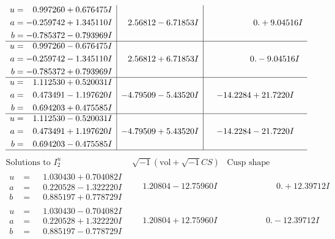 \documentclass[1p]{elsarticle_modified}
\theoremstyle{definition}
\newcommand{\I}{\sqrt{-1}}
\begin{document}
$$\begin{array}{c|c|c}
\begin{aligned}
u &= \phantom{-}0.997260 + 0.676475 I \\
a &= -0.259742 + 1.345110 I \\
b &= -0.785372 - 0.793969 I\end{aligned}
 & \phantom{-}2.56812 - 6.71853 I & \phantom{-0.000000 -}0. + 9.04516 I \\ \hline\begin{aligned}
u &= \phantom{-}0.997260 - 0.676475 I \\
a &= -0.259742 - 1.345110 I \\
b &= -0.785372 + 0.793969 I\end{aligned}
 & \phantom{-}2.56812 + 6.71853 I & \phantom{-0.000000 } 0. - 9.04516 I \\ \hline\begin{aligned}
u &= \phantom{-}1.112530 + 0.520031 I \\
a &= \phantom{-}0.473491 - 1.197620 I \\
b &= \phantom{-}0.694203 + 0.475585 I\end{aligned}
 & -4.79509 - 5.43520 I & -14.2284 + 21.7220 I \\ \hline\begin{aligned}
u &= \phantom{-}1.112530 - 0.520031 I \\
a &= \phantom{-}0.473491 + 1.197620 I \\
b &= \phantom{-}0.694203 - 0.475585 I\end{aligned}
 & -4.79509 + 5.43520 I & -14.2284 - 21.7220 I\\
 \hline 
 \end{array}$$\newpage$$\begin{array}{c|c|c}  
\text{Solutions to }I^u_{2}& \I (\text{vol} + \sqrt{-1}CS) & \text{Cusp shape}\\
 \hline 
\begin{aligned}
u &= \phantom{-}1.030430 + 0.704082 I \\
a &= \phantom{-}0.220528 - 1.322220 I \\
b &= \phantom{-}0.885197 + 0.778729 I\end{aligned}
 & \phantom{-}1.20804 - 12.75960 I & \phantom{-0.000000 -}0. + 12.39712 I \\ \hline\begin{aligned}
u &= \phantom{-}1.030430 - 0.704082 I \\
a &= \phantom{-}0.220528 + 1.322220 I \\
b &= \phantom{-}0.885197 - 0.778729 I\end{aligned}
 & \phantom{-}1.20804 + 12.75960 I & \phantom{-0.000000 } 0. - 12.39712 I \\ \hline\begin{aligned}

\end{aligned}
\end{array}$$
\end{document}
